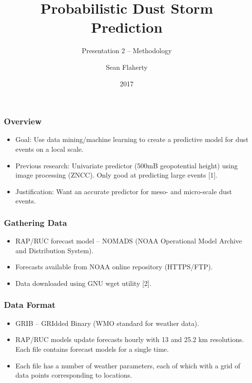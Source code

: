 \documentclass{beamer}
\title{Probabilistic Dust Storm Prediction}
\subtitle{Presentation 2 -- Methodology}
\author{Sean Flaherty}
\date{2017}
\begin{document}
\frame{\titlepage}
\begin{frame}
	\frametitle{Overview}
	\begin{itemize}
		\item
			Goal: Use data mining/machine learning to create a predictive model for dust events on a local scale.
		\item
			Previous research: Univariate predictor (500mB geopotential height) using image processing (ZNCC). Only good at predicting large events [1]. 
		\item
			Justification: Want an accurate predictor for meso- and micro-scale dust events.
	\end{itemize}

\end{frame}
\begin{frame}
	\frametitle{Gathering Data}
	\begin{itemize}
		\item<-1->
			RAP/RUC forecast model -- NOMADS (NOAA Operational Model Archive and Distribution System).
		\item<-2-> Forecasts available from NOAA online repository (HTTPS/FTP).
		\item<-3-> Data downloaded using GNU wget utility [2].
	\end{itemize}
\end{frame}
\begin{frame}
	\frametitle{Data Format}
	\begin{itemize}
		\item
			GRIB -- GRIdded Binary (WMO standard for weather data).
		\item
			RAP/RUC models update forecasts hourly with 13 and 25.2 km resolutions.
		\ite
			Each file contains forecast models for a single time.
		\item
			Each file has a number of weather parameters, each of which with a grid of data points corresponding to locations.	
	\end{itemize}
\end{frame}
\end{document}
